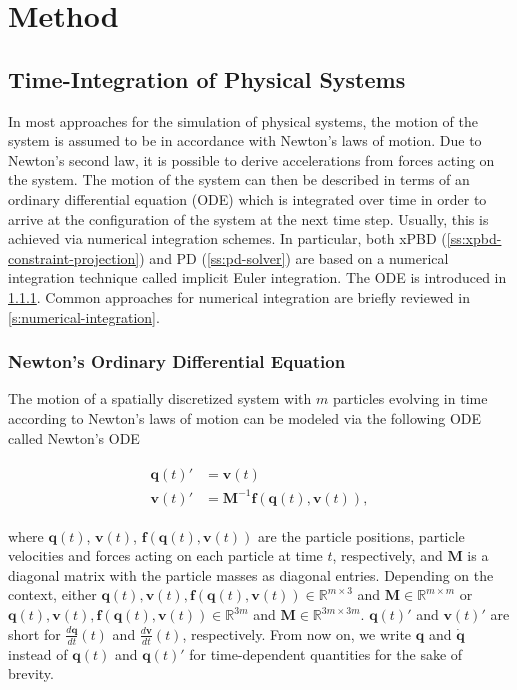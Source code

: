 \chapter{Method}\label{ch:method}

\section{Time-Integration of Physical Systems}\label{s:physical-integration}
In most approaches for the simulation of physical systems, the motion of the system is assumed to be in accordance with Newton's laws of
motion. Due to Newton's second law, it is possible to derive accelerations from forces acting on the system. The motion of the system
can then be described in terms of an ordinary differential equation (ODE) which is integrated over time in order to arrive at the 
configuration of the system at the next time step. Usually, this is achieved via numerical integration schemes. In particular, both
xPBD (\cref{ss:xpbd-constraint-projection}) and PD (\cref{ss:pd-solver}) are based on a numerical integration technique called implicit 
Euler integration. The ODE is introduced in \cref{s:newton-ode}. 
Common approaches for numerical integration are briefly reviewed in \cref{s:numerical-integration}.

\subsection{Newton's Ordinary Differential Equation}\label{s:newton-ode}

The motion of a spatially discretized system with $m$ particles evolving in time according to Newton's laws of motion can be modeled via 
the following ODE called Newton's ODE

\begin{align}
    \begin{split}\label{eq:newton-ode}
        \bm{q}(t)\prime &= \bm{v}(t) \\
        \bm{v}(t)\prime &= \bm{M}^{-1}\bm{f}(\bm{q}(t), \bm{v}(t)),
    \end{split}
\end{align}

\noindent where $\bm{q}(t)$, $\bm{v}(t)$, $\bm{f}(\bm{q}(t), \bm{v}(t))$ are the particle positions, particle velocities and forces acting on each particle
at time $t$, respectively, and $\bm{M}$ is a diagonal matrix with the particle masses as diagonal entries. Depending on the context, either 
$\bm{q}(t), \bm{v}(t), \bm{f}(\bm{q}(t), \bm{v}(t)) \in \mathbb{R}^{m \times 3}$ and $\bm{M} \in \mathbb{R}^{m \times m}$ or $\bm{q}(t), 
\bm{v}(t), \bm{f}(\bm{q}(t), \bm{v}(t)) \in \mathbb{R}^{3m}$ and $\bm{M} \in \mathbb{R}^{3m \times 3m}$. $\bm{q}(t)\prime$ and $\bm{v}(t)\prime$ are short 
for $\frac{d\bm{q}}{dt}(t)$ and
$\frac{d\bm{v}}{dt}(t)$, respectively. From now on, we write $\bm{q}$ and $\dot{\bm{q}}$ instead of $\bm{q}(t)$ and $\bm{q}(t)\prime$ for 
time-dependent quantities for the sake of brevity.

